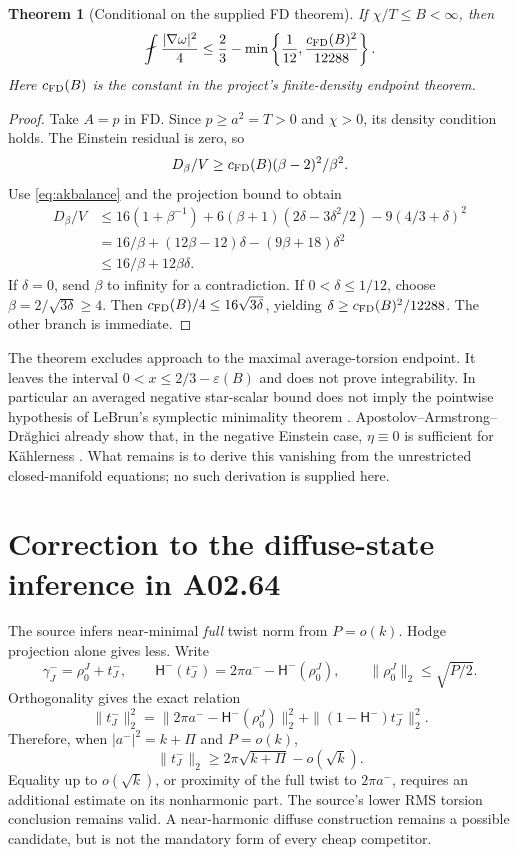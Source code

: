\documentclass[11pt,a4paper]{article}
\newtheorem{theorem}{Theorem}[section]
\theoremstyle{remark}\newtheorem{remark}[theorem]{Remark}
\newcommand{\av}{\mathop{\fint}}
\newcommand{\eps}{\varepsilon}
\begin{document}
\begin{theorem}[Conditional on the supplied FD theorem]\label{thm:torsion}
If $\chi/T\le B<\infty$, then
\[
 \av\frac{|\nabla\omega|^2}{4}
 \le\frac23-\min\left\{\frac1{12},\frac{c_{\rm FD}(B)^2}{12288}\right\}.
\]
Here $c_{\rm FD}(B)$ is the constant in the project's finite-density endpoint theorem.
\end{theorem}
\begin{proof}
Take $A=p$ in FD. Since $p\ge a^2=T>0$ and $\chi>0$, its density condition holds. The Einstein residual is zero, so
\[
 D_\beta/V\ge c_{\rm FD}(B)(\beta-2)^2/\beta^2.
\]
Use \eqref{eq:akbalance} and the projection bound to obtain
\begin{align*}
 D_\beta/V
 &\le16(1+\beta^{-1})
 +6(\beta+1)(2\delta-3\delta^2/2)-9(4/3+\delta)^2\\
 &=16/\beta+(12\beta-12)\delta-(9\beta+18)\delta^2\\
 &\le16/\beta+12\beta\delta.
\end{align*}
If $\delta=0$, send $\beta$ to infinity for a contradiction. If
$0<\delta\le1/12$, choose $\beta=2/\sqrt{3\delta}\ge4$. Then
$c_{\rm FD}(B)/4\le16\sqrt{3\delta}$, yielding
$\delta\ge c_{\rm FD}(B)^2/12288$. The other branch is immediate.
\end{proof}

The theorem excludes approach to the maximal average-torsion endpoint. It leaves the interval $0<x\le2/3-\eps(B)$ and does not prove integrability. In particular an averaged negative star-scalar bound does not imply the pointwise hypothesis of LeBrun's symplectic minimality theorem \cite{LeBrunAK}.
Apostolov--Armstrong--Dr\u aghici already show that, in the negative Einstein case, $\eta\equiv0$ is sufficient for K\"ahlerness \cite{AAD}. What remains is to derive this vanishing from the unrestricted closed-manifold equations; no such derivation is supplied here.

\section{Correction to the diffuse-state inference in A02.64}
The source infers near-minimal \emph{full} twist norm from $P=o(k)$. Hodge projection alone gives less. Write
\[
 \gamma_J^-=\rho_0^J+t_J^-,\qquad
 \mathsf H^-(t_J^-)=2\pi a^--\mathsf H^-(\rho_0^J),
 \qquad\|\rho_0^J\|_2\le\sqrt{P/2}.
\]
Orthogonality gives the exact relation
\[
 \|t_J^-\|_2^2
 =\|2\pi a^--\mathsf H^-(\rho_0^J)\|_2^2
 +\|(1-\mathsf H^-)t_J^-\|_2^2.
\]
Therefore, when $|a^-|^2=k+\Pi$ and $P=o(k)$,
\[
 \|t_J^-\|_2\ge2\pi\sqrt{k+\Pi}-o(\sqrt k).
\]
Equality up to $o(\sqrt k)$, or proximity of the full twist to $2\pi a^-$, requires an additional estimate on its nonharmonic part. The source's lower RMS torsion conclusion remains valid. A near-harmonic diffuse construction remains a possible candidate, but is not the mandatory form of every cheap competitor.
\end{document}

